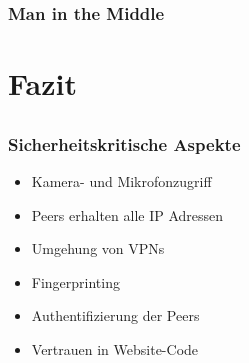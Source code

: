 \documentclass[12pt]{beamer}
\begin{document}
\begin{frame}
  \frametitle{Man in the Middle}
  \centerline{}
\end{frame}


\section{Fazit}
\subsection{}

\begin{frame}
  \frametitle{Sicherheitskritische Aspekte}
  \begin{itemize}
    \item Kamera- und Mikrofonzugriff
    \item Peers erhalten alle IP Adressen
    \item Umgehung von VPNs
    \item Fingerprinting
    \item Authentifizierung der Peers
    \item Vertrauen in Website-Code
  \end{itemize}
\end{frame}
\end{document}
